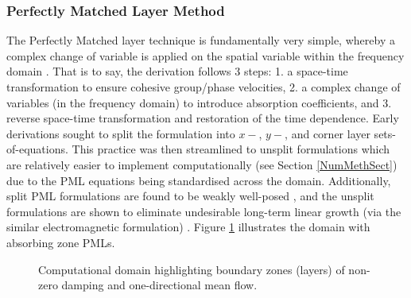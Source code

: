 \subsubsection{Perfectly Matched Layer Method} \label{PerfectlyMatchedLayerMethodSection}

The Perfectly Matched layer technique is fundamentally very simple, whereby a complex change of variable is applied on the spatial variable within the frequency domain \cite{parrish2008analysis}. That is to say, the derivation follows 3 steps: 1. a space-time transformation to ensure cohesive group/phase velocities, 2. a complex change of variables (in the frequency domain) to introduce absorption coefficients, and 3. reverse space-time transformation and restoration of the time dependence. Early derivations \cite{hu1996onabsorbingbc} \cite{parrish2008analysis} sought to split the formulation into $x-$, $y-$, and corner layer sets-of-equations. This practice was then streamlined to unsplit formulations \cite{hu2001astablePML} \cite{tam2012computational} which are relatively easier to implement computationally (see Section \ref{NumMethSect}) due to the PML equations being standardised across the domain. Additionally, split PML formulations are found to be weakly well-posed \cite{abarbanel1997mathanalysispml}, and the unsplit formulations are shown to eliminate undesirable long-term linear growth (via the similar electromagnetic formulation) \cite{becache2004longtime}. Figure \ref{fig:PMLDomain} illustrates the domain with absorbing zone PMLs.

\begin{figure}[h!]
\centering
{}
\caption{Computational domain highlighting boundary zones (layers) of non-zero damping and one-directional mean flow.}
\label{fig:PMLDomain}
\end{figure}

